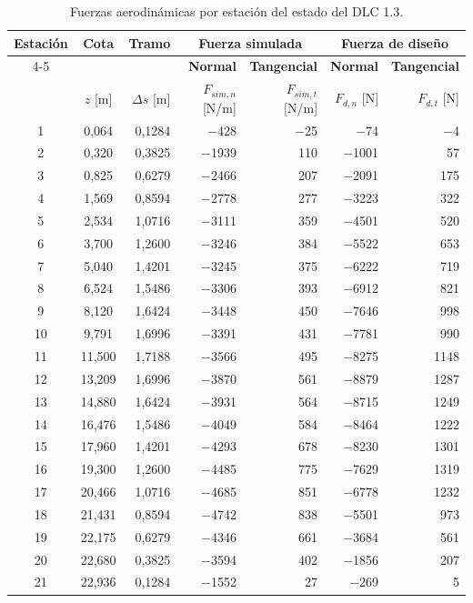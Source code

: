 \begin{table}[H]
    \centering
    \caption{Fuerzas aerodinámicas por estación del estado del DLC 1.3.}
    \label{tab:anexo_fuerzas_dlc13}
    \begin{tabular}{ccrrrrr}
        \hline
        \textbf{Estación} & \textbf{Cota} & \textbf{Tramo} & \multicolumn{2}{c}{\textbf{Fuerza simulada}} & \multicolumn{2}{c}{\textbf{Fuerza de diseño}} \\
        \cline{4-5} \cline{6-7}
        & & & \textbf{Normal} & \textbf{Tangencial} & \textbf{Normal} & \textbf{Tangencial} \\
        & $z$ [m] & $\Delta s$ [m] & $F_{sim,n}$ [N/m] & $F_{sim,t}$ [N/m] & $F_{d,n}$ [N] & $F_{d,t}$ [N] \\
        \hline
        1 & 0{,}064 & 0{,}1284 & $-$428 & $-$25 & $-$74 & $-$4 \\
        2 & 0{,}320 & 0{,}3825 & $-$1939 & 110 & $-$1001 & 57 \\
        3 & 0{,}825 & 0{,}6279 & $-$2466 & 207 & $-$2091 & 175 \\
        4 & 1{,}569 & 0{,}8594 & $-$2778 & 277 & $-$3223 & 322 \\
        5 & 2{,}534 & 1{,}0716 & $-$3111 & 359 & $-$4501 & 520 \\
        6 & 3{,}700 & 1{,}2600 & $-$3246 & 384 & $-$5522 & 653 \\
        7 & 5{,}040 & 1{,}4201 & $-$3245 & 375 & $-$6222 & 719 \\
        8 & 6{,}524 & 1{,}5486 & $-$3306 & 393 & $-$6912 & 821 \\
        9 & 8{,}120 & 1{,}6424 & $-$3448 & 450 & $-$7646 & 998 \\
        10 & 9{,}791 & 1{,}6996 & $-$3391 & 431 & $-$7781 & 990 \\
        11 & 11{,}500 & 1{,}7188 & $-$3566 & 495 & $-$8275 & 1148 \\
        12 & 13{,}209 & 1{,}6996 & $-$3870 & 561 & $-$8879 & 1287 \\
        13 & 14{,}880 & 1{,}6424 & $-$3931 & 564 & $-$8715 & 1249 \\
        14 & 16{,}476 & 1{,}5486 & $-$4049 & 584 & $-$8464 & 1222 \\
        15 & 17{,}960 & 1{,}4201 & $-$4293 & 678 & $-$8230 & 1301 \\
        16 & 19{,}300 & 1{,}2600 & $-$4485 & 775 & $-$7629 & 1319 \\
        17 & 20{,}466 & 1{,}0716 & $-$4685 & 851 & $-$6778 & 1232 \\
        18 & 21{,}431 & 0{,}8594 & $-$4742 & 838 & $-$5501 & 973 \\
        19 & 22{,}175 & 0{,}6279 & $-$4346 & 661 & $-$3684 & 561 \\
        20 & 22{,}680 & 0{,}3825 & $-$3594 & 402 & $-$1856 & 207 \\
        21 & 22{,}936 & 0{,}1284 & $-$1552 & 27 & $-$269 & 5 \\
        \hline
    \end{tabular}
\end{table}

